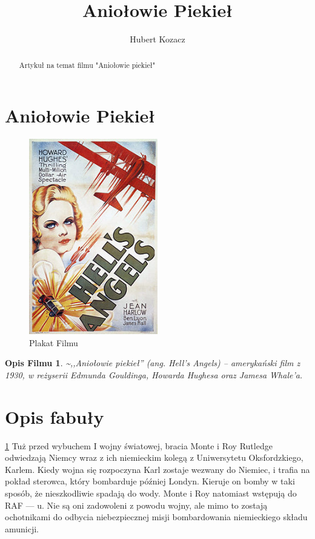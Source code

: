 ﻿\documentclass[32pt,a4paper]{article}
\author{Hubert Kozacz}
\title{Aniołowie Piekieł}
\newtheorem{theorem}{Opis Filmu}
\begin{document}
\begin{abstract}
Artykuł na temat filmu "Aniołowie piekieł"
\end{abstract}
\tableofcontents
\section{Aniołowie Piekieł}
\begin{large}
\begin{figure}[h!]
  \caption{Plakat Filmu}
  \centering
    \includegraphics[width=0.5\textwidth]{pics/Poster.jpg}
\end{figure}
\begin{theorem}
\label{film}
\~{},,Aniołowie piekieł'' (ang. Hell’s Angels) – amerykański film z 1930, w reżyserii Edmunda Gouldinga, Howarda Hughesa oraz Jamesa Whale’a.
\end{theorem}

\section{Opis fabuły}
\begin{large}
\ref{film}
Tuż przed wybuchem I wojny światowej, bracia Monte i Roy Rutledge odwiedzają Niemcy wraz z ich niemieckim kolegą z Uniwersytetu Oksfordzkiego, Karlem. Kiedy wojna się rozpoczyna Karl zostaje wezwany do Niemiec, i trafia na pokład sterowca, który bombarduje później Londyn. Kieruje on bomby w taki sposób, że nieszkodliwie spadają do wody. Monte i Roy natomiast wstępują do RAF --- u. Nie są oni zadowoleni z powodu wojny, ale mimo to zostają ochotnikami do odbycia niebezpiecznej misji bombardowania niemieckiego składu amunicji.

\end{large}
\end{large}
\end{document}
